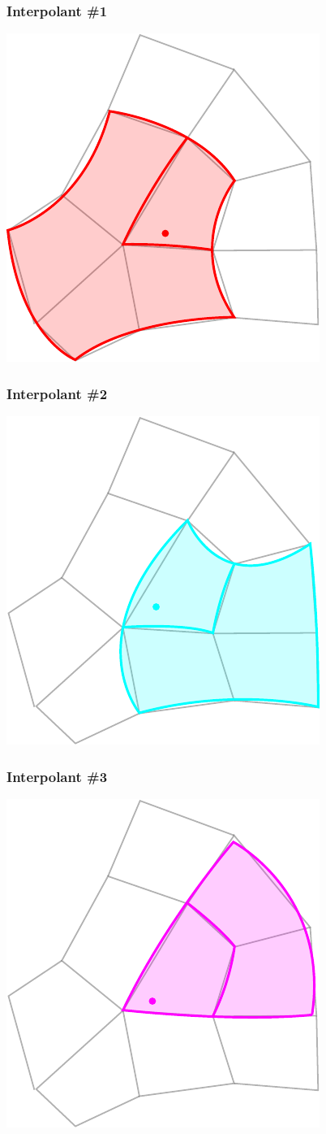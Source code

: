 \documentclass{beamer}
\begin{document}
\begin{frame}
  \frametitle{Interpolant \#1}
  \centering
  \includegraphics[width=.6\textwidth]{images/blend1.pdf}
\end{frame}

\begin{frame}
  \frametitle{Interpolant \#2}
  \centering
  \includegraphics[width=.6\textwidth]{images/blend2.pdf}
\end{frame}

\begin{frame}
  \frametitle{Interpolant \#3}
  \centering
  \includegraphics[width=.6\textwidth]{images/blend3.pdf}
\end{frame}
\end{document}
